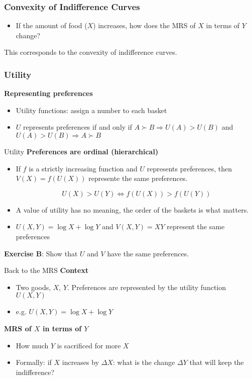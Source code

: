 \documentclass[handout]{beamer}
\begin{document}
\begin{frame}\frametitle{Convexity of Indifference Curves}
\begin{itemize}
\item If the amount of food ($X$) increases, how does the MRS of $X$ in terms of $Y$ change?
\end{itemize}

This corresponds to the convexity of indifference curves. 
\end{frame}

\begin{frame}\frametitle{Utility}

\textbf{Representing preferences}
\begin{itemize}
\item  Utility functions: assign a number to each basket
\item $U$ represents preferences if and only if $ A \succ B \Rightarrow U(A) > U(B)$ and 
$ U(A) > U(B)   \Rightarrow A \succ B$
\end{itemize}
\vfill
\end{frame}

\begin{frame}{Utility}
\textbf{Preferences are ordinal (hierarchical)}
\begin{itemize}
\item If $f$ is a strictly increasing function and $U$ represents preferences, then $V(X) = f(U(X))$ represente the same preferences.

$$ U(X) > U(Y) \iff f(U(X)) > f(U(Y))$$
\item A value of utility has no meaning, the order of the baskets is what matters.
\item $U(X,Y) = \log X + \log Y$ and $V(X,Y) = XY$ represent the same preferences
\end{itemize}
\textbf{Exercise B}: Show that $U$ and $V$ have the same preferences. 
\end{frame}


\begin{frame}{Back to the MRS}
\textbf{Context}
\begin{itemize}
\item Two goods, $X$, $Y$.  Preferences are represented by the utility function $U(X,Y)$
\item e.g. $U(X,Y) = \log X + \log Y$
\end{itemize}
\textbf{MRS of $X$ in terms of $Y$} \pause
\begin{itemize}
\item How much $Y$ is sacrificed for more $X$\pause
\item Formally: if $X$ increases by $\Delta X$: what is the change $\Delta Y $ that will keep the indifference?
\end{itemize}
\end{frame}
\end{document}
